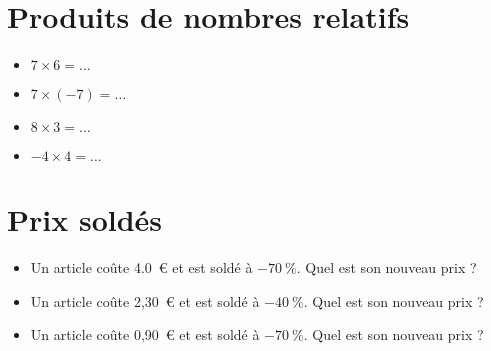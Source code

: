 \documentclass[a4paper,11pt,fleqn]{article}
\begin{document}
\section{Produits de nombres relatifs}
\begin{itemize}

  \item $7\times6=\ldots$
  \item $7\times(-7)=\ldots$
  \item $8\times3=\ldots$
  \item $-4\times4=\ldots$
\end{itemize}


\section{Prix soldés}
\begin{itemize}

  \item Un article coûte 4.0~€ et est soldé à $-70~\%$. Quel est son nouveau prix ?
  \item Un article coûte 2,30~€ et est soldé à $-40~\%$. Quel est son nouveau prix ?
  \item Un article coûte 0,90~€ et est soldé à $-70~\%$. Quel est son nouveau prix ?
\end{itemize}
\end{document}
